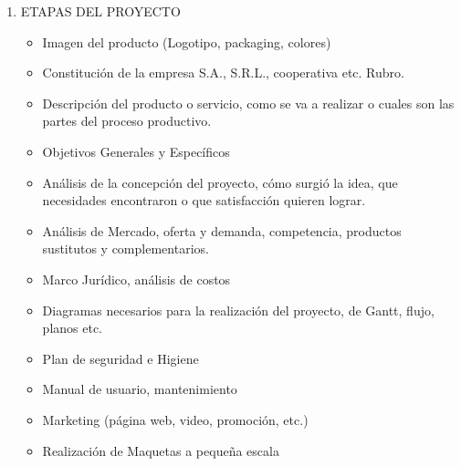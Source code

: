 \documentclass[../main]{subfiles}
\begin{document}
\begin{enumerate}
  \item ETAPAS DEL PROYECTO
    \begin{itemize}
      \item Imagen del producto (Logotipo, packaging,
        colores)
      \item Constitución de la empresa S.A., S.R.L.,
        cooperativa etc. Rubro.
      \item Descripción del producto o servicio, como se va
        a realizar o cuales son las partes del proceso productivo.
      \item Objetivos Generales y Específicos
      \item Análisis de la concepción del proyecto, cómo
        surgió la idea, que necesidades encontraron o
        que satisfacción quieren lograr.
      \item Análisis de Mercado, oferta y demanda,
        competencia, productos sustitutos y
        complementarios.
      \item Marco Jurídico, análisis de costos
      \item Diagramas necesarios para la realización del
        proyecto, de Gantt, flujo, planos etc.
      \item Plan de seguridad e Higiene
      \item Manual de usuario, mantenimiento
      \item Marketing (página web, video, promoción, etc.)
      \item Realización de Maquetas a pequeña escala
    \end{itemize}
\end{enumerate}
\tableofcontents
\newpage
\end{document}
